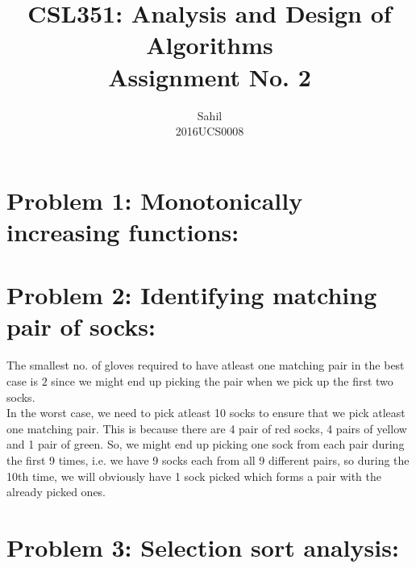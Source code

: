 \documentclass[12pt]{report}
\title{\centering CSL351: Analysis and Design of Algorithms \\Assignment No. 2}
\author{\LARGE Sahil\\2016UCS0008}
\begin{document}
\maketitle

\section{Problem 1: Monotonically increasing functions:}



\section{Problem 2: Identifying matching pair of socks:}
The smallest no. of gloves required to have atleast one matching pair in the best case is $2$ since we might end up picking the pair when we pick up the first two socks. 
\\ 
In the worst case, we need to pick atleast 10 socks to ensure that we pick atleast one matching pair. This is because there are 4 pair of red socks, 4 pairs of yellow and 1 pair of green. So, we might end up picking one sock from each pair during the first 9 times, i.e. we have 9 socks each from all 9 different pairs, so during the 10th time, we will obviously have 1 sock picked which forms a pair with the already picked ones. 

\section{Problem 3: Selection sort analysis:}


\end{document}
